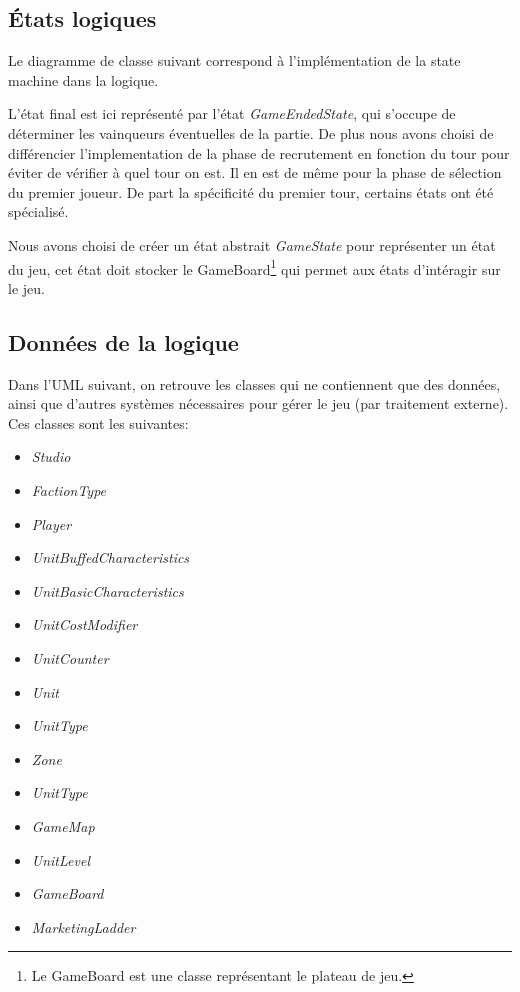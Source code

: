 \subsection{États logiques}

Le diagramme de classe suivant correspond à l'implémentation de la state machine
dans la logique.


L'état final est ici représenté par l'état \textit{GameEndedState}, qui s'occupe de
déterminer les vainqueurs éventuelles de la partie.
De plus nous avons choisi de différencier l'implementation de la phase de
recrutement en fonction du tour pour éviter de vérifier à quel tour on est.
Il en est de même pour la phase de sélection du premier joueur. \newline
De part la spécificité du premier tour, certains états ont été spécialisé.

Nous avons choisi de créer un état abstrait \textit{GameState} pour
représenter un état du jeu, cet état doit stocker le GameBoard\footnote{Le GameBoard
  est une classe représentant le plateau de jeu.}
qui permet aux états d'intéragir sur le jeu.

\subsection{Données de la logique}

Dans l'UML suivant, on retrouve les classes qui ne contiennent que des données,
ainsi que d'autres systèmes nécessaires pour gérer le jeu (par traitement externe).
Ces classes sont les suivantes:
\begin{itemize}
    \item \textit{Studio}
    \item \textit{FactionType}
    \item \textit{Player}
    \item \textit{UnitBuffedCharacteristics}
    \item \textit{UnitBasicCharacteristics}
    \item \textit{UnitCostModifier}
    \item \textit{UnitCounter}
    \item \textit{Unit}
    \item \textit{UnitType}
    \item \textit{Zone}
    \item \textit{UnitType}
    \item \textit{GameMap}
    \item \textit{UnitLevel}
    \item \textit{GameBoard}
    \item \textit{MarketingLadder}
\end{itemize}

